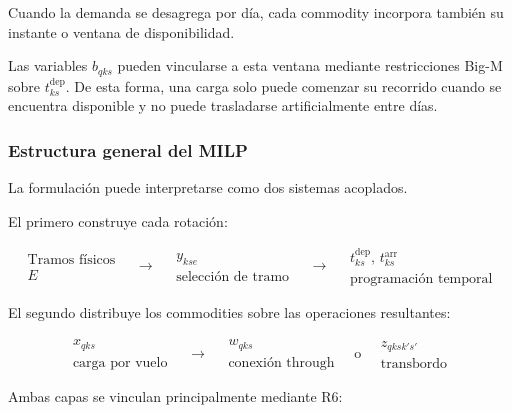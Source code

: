 Cuando la demanda se desagrega por día, cada commodity incorpora también su instante o ventana
de disponibilidad.

Las variables $b_{qks}$ pueden vincularse a esta ventana mediante restricciones Big-M sobre
$t_{ks}^{\mathrm{dep}}$. De esta forma, una carga solo puede comenzar su recorrido cuando se
encuentra disponible y no puede trasladarse artificialmente entre días.


\subsubsection{Estructura general del MILP}
\label{app:estructura_milp}

La formulación puede interpretarse como dos sistemas acoplados.

El primero construye cada rotación:

\[
\boxed{
\begin{array}{c}
\text{Tramos físicos}\\
E
\end{array}
}
\quad\longrightarrow\quad
\boxed{
\begin{array}{c}
y_{kse}\\
\text{selección de tramo}
\end{array}
}
\quad\longrightarrow\quad
\boxed{
\begin{array}{c}
t_{ks}^{\mathrm{dep}},\,t_{ks}^{\mathrm{arr}}\\
\text{programación temporal}
\end{array}
}
\]

El segundo distribuye los commodities sobre las operaciones resultantes:

\[
\boxed{
\begin{array}{c}
x_{qks}\\
\text{carga por vuelo}
\end{array}
}
\quad\longrightarrow\quad
\boxed{
\begin{array}{c}
w_{qks}\\
\text{conexión through}
\end{array}
}
\quad\text{o}\quad
\boxed{
\begin{array}{c}
z_{qksk's'}\\
\text{transbordo}
\end{array}
}
\]

Ambas capas se vinculan principalmente mediante R6:

